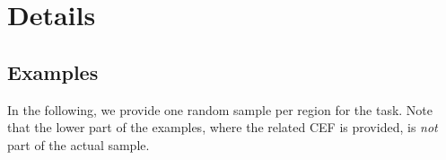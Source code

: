 \section{\sivqa Details}
\label{appendix:sec:sivqa}
%

\clearpage
\subsection{Examples}
\label{appendix:sec:sivqa:examples}
%
In the following, we provide one random sample per region for the \sivqa task.
%
Note that the lower part of the examples, where the related CEF is provided, is \emph{not} part of the actual sample.

%
\subsubsection*{\RegA}
%

%
\subsubsection*{\RegAP}
%

%
\subsubsection*{\RegE}
%

%
\subsubsection*{\RegLAC}
%

%
\subsubsection*{\RegSA}
%

%
\subsubsection*{\RegW}
%

%

